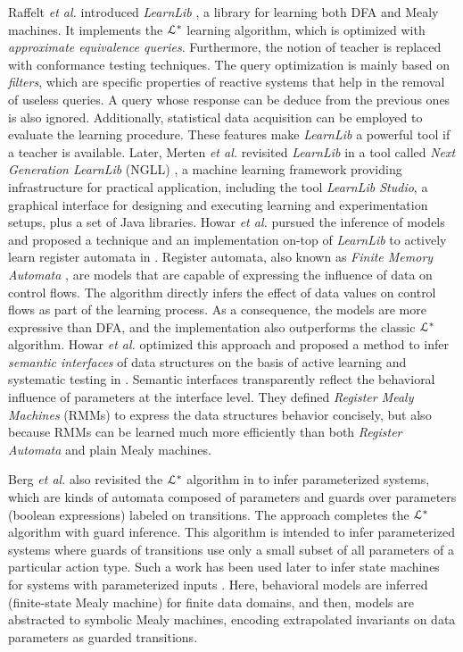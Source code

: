 Raffelt \emph{et al.} introduced \textit{LearnLib}
\cite{Raffelt:2005:LLA:1081180.1081189}, a library for learning
both DFA and Mealy machines. It implements the $\EuScript{L}^*$
\cite{Angluin198787} learning algorithm, which is optimized with
\textit{approximate equivalence queries}. Furthermore, the
notion of teacher is replaced with conformance testing
techniques. The query optimization is mainly based on
\textit{filters}, which are specific properties of reactive
systems that help in the removal of useless queries. A query
whose response can be deduce from the previous ones is also
ignored. Additionally, statistical data acquisition can be
employed to evaluate the learning procedure. These features make
\textit{LearnLib} a powerful tool if a teacher is available.
Later, Merten \emph{et al.} revisited \textit{LearnLib} in a tool called
\textit{Next Generation LearnLib} (NGLL) \cite{ngll11}, a machine
learning framework providing infrastructure for practical
application, including the tool \textit{LearnLib Studio}, a
graphical interface for designing and executing learning and
experimentation setups, plus a set of Java libraries. Howar
\emph{et al.} pursued the inference of models  and proposed a
technique and an implementation on-top of \textit{LearnLib} to
actively learn register automata in \cite{howarRA2012}. Register
automata, also known as \textit{Finite Memory Automata}
\cite{Kaminski1994329}, are models that are capable of expressing
the influence of data on control flows. The algorithm directly
infers the effect of data values on control flows as part of the
learning process. As a consequence, the models are more
expressive than DFA, and the implementation also outperforms the
classic $\EuScript{L}^*$ algorithm. Howar \emph{et al.} optimized
this approach and proposed a method to infer \textit{semantic
interfaces} of data structures on the basis of active learning
and systematic testing in \cite{howar2012}. Semantic interfaces
transparently reflect the behavioral influence of parameters at
the interface level.  They defined \textit{Register Mealy
Machines} (RMMs) to express the data structures behavior
concisely, but also because RMMs can be learned much more
efficiently than both \textit{Register Automata} and plain Mealy
machines.

Berg \emph{et al.} also revisited the $\EuScript{L}^*$ algorithm in
\cite{regularinfBerg06} to infer parameterized systems, which are
kinds of automata composed of parameters and guards over
parameters (boolean expressions) labeled on transitions. The
approach completes the  $\EuScript{L}^*$ algorithm with guard
inference. This algorithm is intended to infer parameterized
systems where guards of transitions use only a small subset of
all parameters of a particular action type. Such a work has been
used later to infer state machines for systems with parameterized
inputs \cite{regularinfBerg08}. Here, behavioral models are
inferred (finite-state Mealy machine) for finite data domains,
and then, models are abstracted to symbolic Mealy machines,
encoding extrapolated invariants on data parameters as guarded
transitions.

